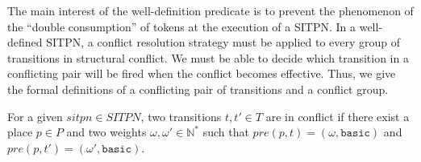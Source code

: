 



The main interest of the well-definition predicate is to prevent the
phenomenon of the ``double consumption'' of tokens at the execution of
a SITPN. In a well-defined SITPN, a conflict resolution strategy must
be applied to every group of transitions in structural conflict.  We
must be able to decide which transition in a conflicting pair will be
fired when the conflict becomes effective. Thus, we give the formal
definitions of a conflicting pair of transitions and a conflict group.

\begin{definition}[Conflict]
  \label{def:conflict}
  For a given $sitpn\in{}SITPN$, two transitions $t,t'\in{}T$ are in
  conflict if there exist a place $p\in{}P$ and two weights
  $\omega,\omega'\in\mathbb{N}^{*}$ such that
  $pre(p,t)=(\omega,\mathtt{basic})$ and
  $pre(p,t')=(\omega',\mathtt{basic})$.
\end{definition}

